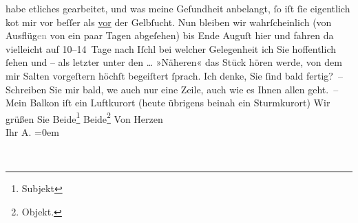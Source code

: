 \begin{ledgroupsized}[t]{13cm}
               habe etliches gearbeitet, und was meine Geſundheit anbelangt, ſo iſt ſie eigentlich
                  ko{\geminationm}t mir vor beſſer als \uline{vor} der Gelbſucht. Nun bleiben wir wahrſcheinlich (\introOben{}von\introOben{} Ausflüg\textcolor{gray}{en} von ein paar Tagen abge{\pb}ſehen) bis Ende Auguſt hier und fahren
                  da{\geminationn} vielleicht auf 10–14 Tage nach Iſchl bei welcher Gelegenheit ich Sie hoffentlich ſehen und –
               als letzter unter den {\dots} »Näheren« das Stück hören werde, von dem mir Salten vorgeſtern höchſt begeiſtert ſprach. Ich denke, {\pb}Sie ſind bald fertig? –\pend
           \pstart
           Schreiben Sie mir bald, we{\geminationn} auch nur eine Zeile, auch
               wie es Ihnen allen geht. –\pend
           \pstart
           Mein Balkon iſt ein Luftkurort (heute übrigens beinah ein Sturmkurort)\pend
           \pstart
           Wir grüßen Sie Beide\footnote{\noindent{}Subjekt} Beide\footnote{\noindent{}Objekt.}\pend
           \pstart
           Von Herzen{\\[\baselineskip]}Ihr \spacefill\mbox{A.}\pend
           \leftskip=0em{}\endnumbering{}\end{ledgroupsized}  \newcommand{\dateiname}{L01420}\newcommand{\titel}{Arthur Schnitzler an Richard Beer-Hofmann, 28. 7. 1904}\newcommand{\editorInnen}{Martin Anton Müller und Gerd-Hermann Susen}
      